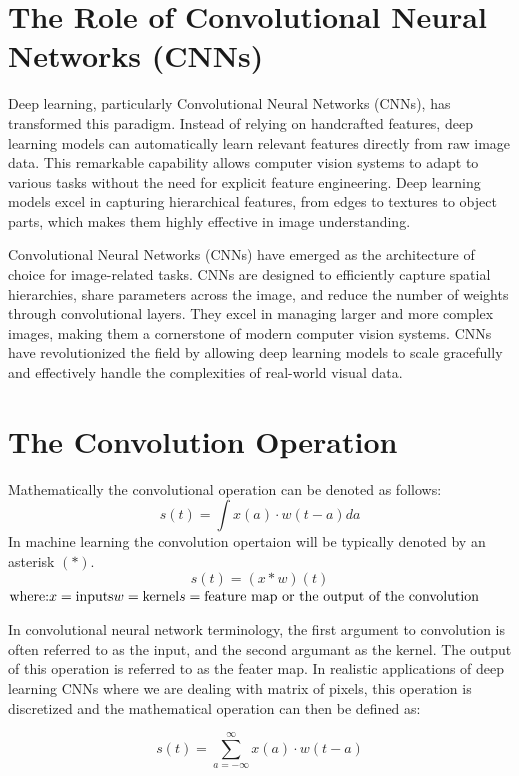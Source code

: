 \documentclass{report}
\begin{document}
\section{The Role of Convolutional Neural Networks (CNNs)}

Deep learning, particularly Convolutional Neural Networks (CNNs), has transformed this paradigm. Instead of relying on handcrafted features, deep learning models can automatically learn relevant features directly from raw image data. This remarkable capability allows computer vision systems to adapt to various tasks without the need for explicit feature engineering. Deep learning models excel in capturing hierarchical features, from edges to textures to object parts, which makes them highly effective in image understanding.

Convolutional Neural Networks (CNNs) have emerged as the architecture of choice for image-related tasks. CNNs are designed to efficiently capture spatial hierarchies, share parameters across the image, and reduce the number of weights through convolutional layers. They excel in managing larger and more complex images, making them a cornerstone of modern computer vision systems. CNNs have revolutionized the field by allowing deep learning models to scale gracefully and effectively handle the complexities of real-world visual data.


\section{The Convolution Operation}
Mathematically the convolutional operation can be denoted as follows:
$$s(t) = \int{x(a) \cdot w(t-a)da}$$
In machine learning the convolution opertaion will be typically denoted by an asterisk $(\ast)$.
$$s(t) = (x \ast w)(t)$$
$\textrm{where:}\\ x = \textrm{inputs} \\ w = \textrm{kernel} \\ s = \textrm{feature map or the output of the convolution}$

In convolutional neural network terminology, the first argument to convolution is often referred
 to as the input, and the second argumant as the kernel. The output of this operation is referred to as the feater map. In realistic applications of deep learning CNNs where we are dealing with matrix of pixels, this operation is discretized and the mathematical operation can then be defined as:

$$s(t) = \sum_{a=-\infty}^{\infty}x(a)\cdot w(t-a)$$
\end{document}
